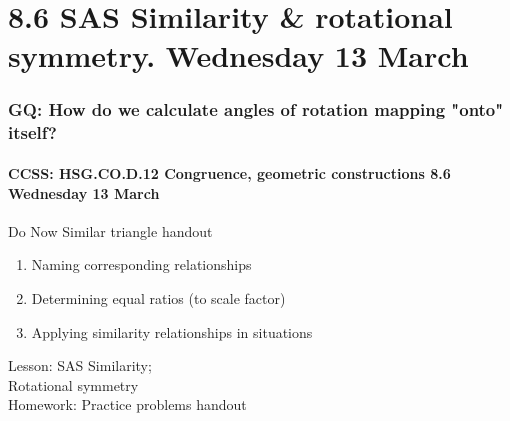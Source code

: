\documentclass{beamer}
\begin{document}
\section{8.6 SAS Similarity \& rotational symmetry. Wednesday 13 March}
  \frame
  {
    \frametitle{GQ: How do we calculate angles of rotation mapping "onto" itself?}
    \framesubtitle{CCSS: HSG.CO.D.12 Congruence, geometric constructions \hfill \alert{8.6 Wednesday 13 March}}

    \begin{block}{Do Now Similar triangle handout}
      \begin{enumerate}
        \item Naming corresponding relationships
        \item Determining equal ratios (to scale factor)
        \item Applying similarity relationships in situations
      \end{enumerate}
    \end{block}
    Lesson: SAS Similarity;
    \\Rotational symmetry\\[0.5cm]
    Homework: Practice problems handout
  }
\end{document}
